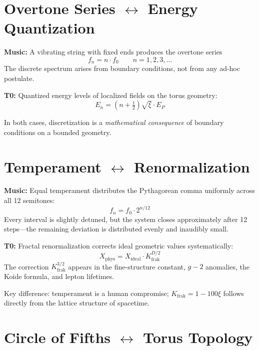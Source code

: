 \section{\texorpdfstring{Overtone Series $\leftrightarrow$ Energy Quantization}{Overtone Series -- Energy Quantization}}

\textbf{Music:} A vibrating string with fixed ends produces the overtone series
\begin{equation}
	f_n = n \cdot f_0 \qquad n = 1, 2, 3, \ldots
\end{equation}
The discrete spectrum arises from boundary conditions, not from any ad-hoc postulate.

\textbf{T0:} Quantized energy levels of localized fields on the torus geometry:
\begin{equation}
	E_n = \left(n + \tfrac{1}{2}\right) \sqrt{\xi} \cdot E_P
\end{equation}

In both cases, discretization is a \emph{mathematical consequence} of boundary conditions on a bounded geometry.

\section{\texorpdfstring{Temperament $\leftrightarrow$ Renormalization}{Temperament -- Renormalization}}

\textbf{Music:} Equal temperament distributes the Pythagorean comma uniformly across all 12 semitones:
\begin{equation}
	f_n = f_0 \cdot 2^{n/12}
\end{equation}
Every interval is slightly detuned, but the system closes approximately after 12 steps---the remaining deviation is distributed evenly and inaudibly small.

\textbf{T0:} Fractal renormalization corrects ideal geometric values systematically:
\begin{equation}
	X_\text{phys} = X_\text{ideal} \cdot K_\text{frak}^{D/2}
\end{equation}
The correction $K_\text{frak}^{3/2}$ appears in the fine-structure constant, $g-2$ anomalies, the Koide formula, and lepton lifetimes.

Key difference: temperament is a human compromise; $K_\text{frak} = 1 - 100\xi$ follows directly from the lattice structure of spacetime.

\section{\texorpdfstring{Circle of Fifths $\leftrightarrow$ Torus Topology}{Circle of Fifths -- Torus Topology}}

